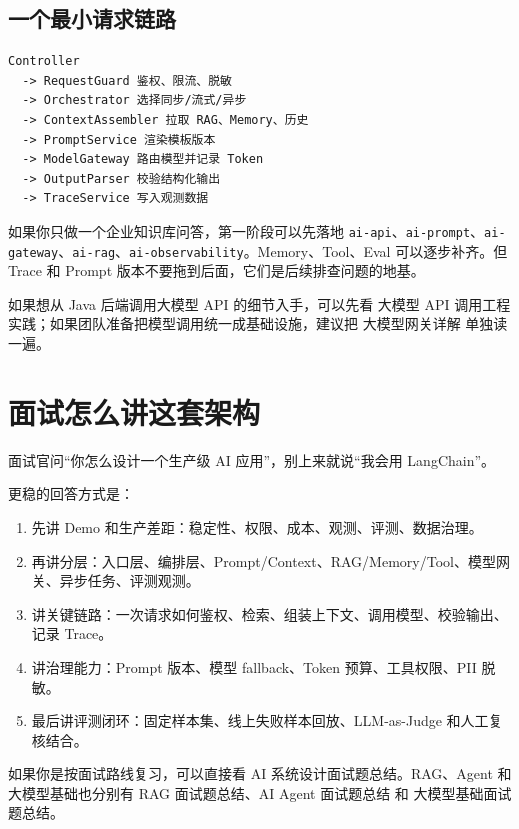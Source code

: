\documentclass[10pt,a4paper]{ctexart}
\begin{document}
\subsection{一个最小请求链路}


\begin{lstlisting}
Controller
  -> RequestGuard 鉴权、限流、脱敏
  -> Orchestrator 选择同步/流式/异步
  -> ContextAssembler 拉取 RAG、Memory、历史
  -> PromptService 渲染模板版本
  -> ModelGateway 路由模型并记录 Token
  -> OutputParser 校验结构化输出
  -> TraceService 写入观测数据
\end{lstlisting}



如果你只做一个企业知识库问答，第一阶段可以先落地 \texttt{ai-api}、\texttt{ai-prompt}、\texttt{ai-gateway}、\texttt{ai-rag}、\texttt{ai-observability}。Memory、Tool、Eval 可以逐步补齐。但 Trace 和 Prompt 版本不要拖到后面，它们是后续排查问题的地基。



如果想从 Java 后端调用大模型 API 的细节入手，可以先看 大模型 API 调用工程实践；如果团队准备把模型调用统一成基础设施，建议把 大模型网关详解 单独读一遍。



\section{面试怎么讲这套架构}


面试官问“你怎么设计一个生产级 AI 应用”，别上来就说“我会用 LangChain”。



更稳的回答方式是：


\begin{enumerate}[itemsep=2pt, topsep=4pt]
  \item 先讲 Demo 和生产差距：稳定性、权限、成本、观测、评测、数据治理。
  \item 再讲分层：入口层、编排层、Prompt/Context、RAG/Memory/Tool、模型网关、异步任务、评测观测。
  \item 讲关键链路：一次请求如何鉴权、检索、组装上下文、调用模型、校验输出、记录 Trace。
  \item 讲治理能力：Prompt 版本、模型 fallback、Token 预算、工具权限、PII 脱敏。
  \item 最后讲评测闭环：固定样本集、线上失败样本回放、LLM-as-Judge 和人工复核结合。
\end{enumerate}


如果你是按面试路线复习，可以直接看 AI 系统设计面试题总结。RAG、Agent 和大模型基础也分别有 RAG 面试题总结、AI Agent 面试题总结 和 大模型基础面试题总结。
\end{document}
